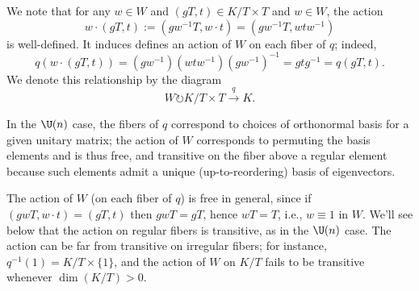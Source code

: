 \documentclass[reqno]{amsart} 
\begin{document}
We note that for any $w \in W$ and $(g T,t) \in K/T \times T$ and $w \in W$, the action
\begin{equation*}
  w \cdot (g T, t) := (g w^{-1} T, w \cdot t) = (g w^{-1} T, w t w^{-1})
\end{equation*}
is well-defined.  It induces defines an action of $W$ on each fiber of $q$; indeed,
\begin{equation*}
  q(w \cdot (g T, t)) = (g w^{-1}) (w t w^{-1}) (g w^{-1})^{-1} = g t g^{-1} = q(g T, t).
\end{equation*}
We denote this relationship by the diagram
\begin{equation*}
  W \circlearrowright K/T \times T \xrightarrow{q} K.
\end{equation*}

In the $\U(n)$ case, the fibers of $q$ correspond to choices of orthonormal basis for a given unitary matrix; the action of $W$ corresponds to permuting the basis elements and is thus free, and transitive on the fiber above a regular element because such elements admit a unique (up-to-reordering) basis of eigenvectors.

The action of $W$ (on each fiber of $q$) is free in general, since if $(g w T, w \cdot t) = (g T, t)$ then $g w T = g T$, hence $w T = T$, i.e., $w \equiv 1$ in $W$.  We'll see below that the action on regular fibers is transitive, as in the $\U(n)$ case.  The action can be far from transitive on irregular fibers; for instance, $q^{-1}(1) = K/T \times \{1\}$, and the action of $W$ on $K/T$ fails to be transitive whenever $\dim(K/T) > 0$.
\end{document}
